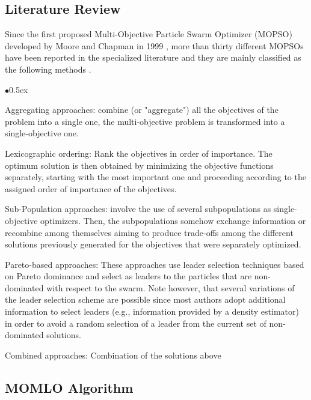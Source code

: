 \documentclass[12pt, runningheads,a4paper]{llncs}
\begin{document}
\subsection{Literature Review}
Since the first proposed Multi-Objective Particle Swarm Optimizer (MOPSO) developed by Moore and Chapman in 1999 \cite{moore1999}, more than thirty different MOPSOs have been reported in the specialized literature and they are mainly classified as the following methods \cite{mosurvey}.

\begin{list}{$\bullet$}{\itemsep 0.5ex}

\item Aggregating approaches: combine (or "aggregate") all the objectives of the problem into a single one, the multi-objective problem is transformed into a single-objective one.

\item Lexicographic ordering: Rank the objectives in order of importance. The optimum solution is then obtained by minimizing the objective functions separately, starting with the most important one and proceeding according to the assigned order of importance of the objectives.

\item Sub-Population approaches: involve the use of several subpopulations as single-objective optimizers. Then, the subpopulations somehow exchange information or recombine among themselves aiming to produce trade-offs among the different solutions previously generated for the objectives that were separately optimized.
\item Pareto-based approaches: These approaches use leader selection techniques based on Pareto dominance and select as leaders to the particles that are non-dominated with respect to the swarm. Note however, that several variations of the leader selection scheme are possible since most authors adopt additional information to select leaders (e.g., information provided by a density estimator) in order to avoid a random selection of a leader from the current set of non-dominated solutions.
\item Combined approaches: Combination of the solutions above

\end{list}

\subsection{MOMLO Algorithm}
\end{document}
